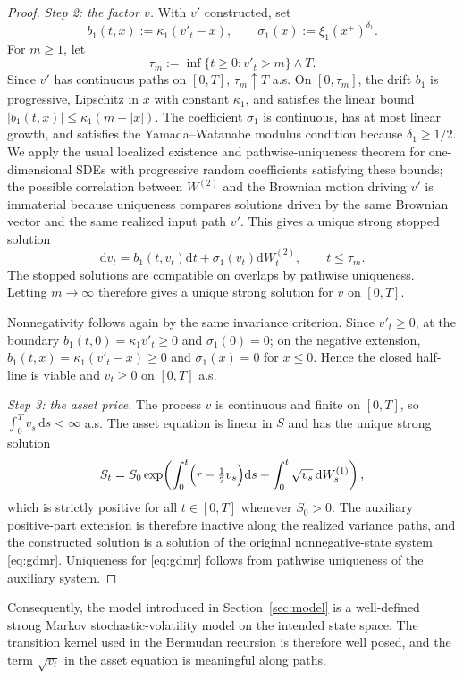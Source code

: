 \documentclass[pdflatex,sn-mathphys-num]{sn-jnl}
\theoremstyle{thmstyleone}%
\theoremstyle{thmstylethree}%
\theoremstyle{thmstyletwo}%
\newcommand{\dd}{\mathrm d}
\begin{document}
\begin{proof}
\emph{Step 2: the factor $v$.}
With $v'$ constructed, set
\[
b_1(t,x):=\kappa_1(v'_t-x),\qquad \sigma_1(x):=\xi_1(x^+)^{\delta_1}.
\]
For $m\ge1$, let
\[
\tau_m:=\inf\{t\ge0:v'_t>m\}\wedge T.
\]
Since $v'$ has continuous paths on $[0,T]$, $\tau_m\uparrow T$ a.s. On $[0,\tau_m]$, the drift $b_1$ is progressive, Lipschitz in $x$ with constant $\kappa_1$, and satisfies the linear bound $|b_1(t,x)|\le\kappa_1(m+|x|)$. The coefficient $\sigma_1$ is continuous, has at most linear growth, and satisfies the Yamada--Watanabe modulus condition because $\delta_1\ge1/2$. We apply the usual localized existence and pathwise-uniqueness theorem for one-dimensional SDEs with progressive random coefficients satisfying these bounds; the possible correlation between $W^{(2)}$ and the Brownian motion driving $v'$ is immaterial because uniqueness compares solutions driven by the same Brownian vector and the same realized input path $v'$. This gives a unique strong stopped solution
\[
\dd v_t=b_1(t,v_t)\dd t+\sigma_1(v_t)\dd W^{(2)}_t,\qquad t\le\tau_m.
\]
The stopped solutions are compatible on overlaps by pathwise uniqueness. Letting $m\to\infty$ therefore gives a unique strong solution for $v$ on $[0,T]$.

Nonnegativity follows again by the same invariance criterion. Since $v'_t\ge0$, at the boundary $b_1(t,0)=\kappa_1v'_t\ge0$ and $\sigma_1(0)=0$; on the negative extension, $b_1(t,x)=\kappa_1(v'_t-x)\ge0$ and $\sigma_1(x)=0$ for $x\le0$. Hence the closed half-line is viable and $v_t\ge0$ on $[0,T]$ a.s.

\emph{Step 3: the asset price.}
The process $v$ is continuous and finite on $[0,T]$, so $\int_0^T v_s\,\dd s<\infty$ a.s. The asset equation is linear in $S$ and has the unique strong solution
\[
S_t
= S_0 \exp\!\left(
\int_0^t \Bigl(r-\tfrac12 v_s\Bigr)\dd s + \int_0^t \sqrt{v_s}\,\dd W^{(1)}_s
\right),
\]
which is strictly positive for all $t\in[0,T]$ whenever $S_0>0$. The auxiliary positive-part extension is therefore inactive along the realized variance paths, and the constructed solution is a solution of the original nonnegative-state system \eqref{eq:gdmr}. Uniqueness for \eqref{eq:gdmr} follows from pathwise uniqueness of the auxiliary system.
\end{proof}

Consequently, the model introduced in Section~\ref{sec:model} is a well-defined strong Markov stochastic-volatility model on the intended state space. The transition kernel used in the Bermudan recursion is therefore well posed, and the term $\sqrt{v_t}$ in the asset equation is meaningful along paths.
\end{document}
